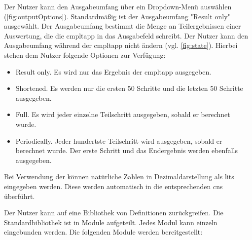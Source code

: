 \documentclass[parskip=full,11pt,twoside]{scrartcl}
\begin{document}
Der Nutzer kann den Ausgabeumfang über ein Dropdown-Menü auswählen (\cref{fig:outputOptions}). 
Standardmäßig ist der Ausgabeumfang "Result only" ausgewählt. 
Der Ausgabeumfang bestimmt die Menge an Teilergebnissen einer Auswertung, die die \gls{cmpltapp} in das Ausgabefeld schreibt.
Der Nutzer kann den Ausgabeumfang während der \gls{cmpltapp} nicht ändern (vgl. \cref{fig:state}).
Hierbei stehen dem Nutzer folgende Optionen zur Verfügung:
\begin{itemize}
	\item Result only. Es wird nur das Ergebnis der \gls{cmpltapp} ausgegeben.
	\item Shortened. Es werden nur die ersten 50 Schritte und die letzten 50 Schritte ausgegeben.
	\item Full. Es wird jeder einzelne Teilschritt ausgegeben, sobald er berechnet wurde.
	\item Periodically. Jeder hundertste Teilschritt wird ausgegeben, sobald er berechnet wurde. 
	Der erste Schritt und das Endergebnis werden ebenfalls ausgegeben.
\end{itemize}


Bei Verwendung der  können natürliche
Zahlen in Dezimaldarstellung als \glspl{lit} eingegeben werden. Diese werden automatisch in die
entsprechenden \glspl{cn} überführt.

Der Nutzer kann auf eine Bibliothek von Definitionen zurückgreifen. Die Standardbibliothek
ist in Module aufgeteilt. Jedes Modul kann einzeln eingebunden werden. Die folgenden
Module werden bereitgestellt:
\end{document}
